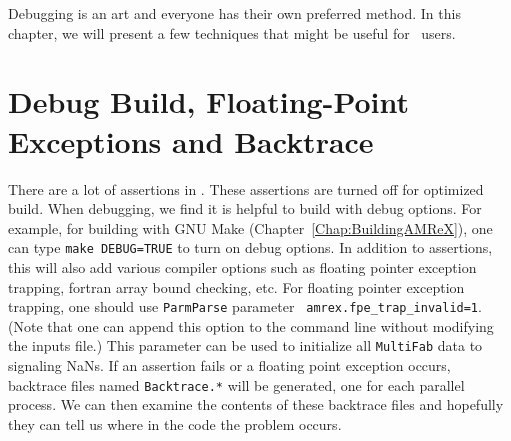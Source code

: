 Debugging is an art and everyone has their own preferred method.  In
this chapter, we will present a few techniques that might be useful
for \amrex\ users.

\section{Debug Build, Floating-Point Exceptions and Backtrace}
\label{sec:debug:fpe}

There are a lot of assertions in \amrex.  These assertions are turned
off for optimized build.  When debugging, we find it is helpful to
build with debug options.  For example, for building with GNU Make
(Chapter~\ref{Chap:BuildingAMReX}), one can type {\tt make DEBUG=TRUE}
to turn on debug options.  In addition to assertions, this will also
add various compiler options such as floating pointer exception
trapping, fortran array bound checking, etc.  For floating pointer
exception trapping, one should use {\tt ParmParse} parameter {\tt
amrex.fpe\_trap\_invalid=1}.  (Note that one can append this option to
the command line without modifying the inputs file.)  This parameter
can be used to initialize all {\tt MultiFab} data to signaling NaNs.
If an assertion fails or a floating point exception occurs, backtrace
files named {\tt Backtrace.*} will be generated, one for each parallel
process.  We can then examine the contents of these backtrace files
and hopefully they can tell us where in the code the problem occurs.






